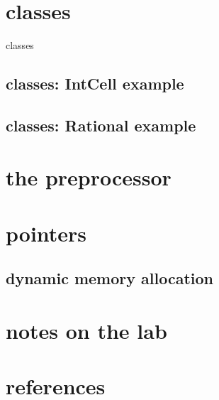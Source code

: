 \section{classes}

\begin{frame}{classes}
\end{frame}

\subsection{classes: IntCell example}



\subsection{classes: Rational example}




\section{the preprocessor}



\section{pointers}



\subsection{dynamic memory allocation}



\section{notes on the lab}




\section{references}



